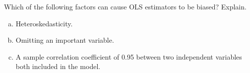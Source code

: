 \item Which of the following factors can cause OLS estimators to be biased? Explain. %
	\begin{enumerate}[a.]
		\item Heteroskedasticity.
		\item Omitting an important variable.
		\item A sample correlation coefficient of 0.95 between two independent variables both included in the model.
	\end{enumerate}